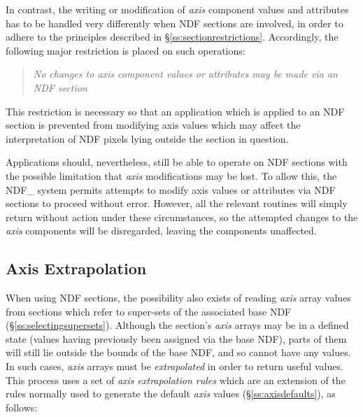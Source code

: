 \documentclass[twoside,11pt,nolof]{starlink}
\providecommand{\st}[1]{{\emph{#1}}}
\begin{document}
In contrast, the writing or modification of \st{axis\/} component values
and attributes has to be handled very differently when NDF sections are
involved, in order to adhere to the principles described in
\S\ref{ss:sectionrestrictions}.
Accordingly, the following major restriction is placed on such operations:

\begin{quote}
\begin{center}
\st{No changes to axis component values or attributes may be made via an
NDF section}
\end{center}
\end{quote}

This restriction is necessary so that an application which is applied to an
NDF section is prevented from modifying axis values which may affect the
interpretation of NDF pixels lying outside the section in question.

Applications should, nevertheless, still be able to operate on NDF sections
with the possible limitation that \st{axis\/} modifications may be lost.
To allow this, the NDF\_ system permits attempts to modify axis values or
attributes via NDF sections to proceed without error.
However, all the relevant routines will simply return without action under
these circumstances, so the attempted changes to the \st{axis\/} components
will be disregarded, leaving the components unaffected.

\subsection{Axis Extrapolation}

When using NDF sections, the possibility also exists of reading \st{axis\/}
array values from sections which refer to super-sets of the associated base
NDF (\S\ref{ss:selectingsupersets}).
Although the section's \st{axis\/} arrays may be in a defined state (values
having previously been assigned via the base NDF), parts of them will still
lie outside the bounds of the base NDF, and so cannot have any values.
In such cases, \st{axis\/} arrays must be \st{extrapolated\/} in order to
return useful values.
This process uses a set of \st{axis extrapolation rules\/} which are an
extension of the rules normally used to generate the default \st{axis\/}
values (\S\ref{ss:axisdefaults}), as follows:
\end{document}
